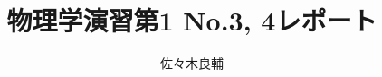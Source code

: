 \documentclass[uplatex,a4j,11pt]{jsarticle}
\begin{document}
\title{物理学演習第1 No.3, 4レポート}
\author{佐々木良輔}
\date{}
\maketitle

\newpage

\end{document}
